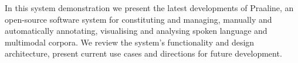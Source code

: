 In this system demonstration we present the latest developments of Praaline, an open-source software system for constituting and managing, manually and automatically annotating, visualising and analysing spoken language and multimodal corpora. We review the system's functionality and design architecture, present current use cases and directions for future development.
